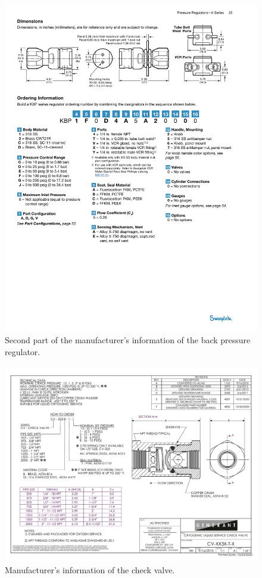 \begin{figure}[h]
    \centering
    \includegraphics[width=\textwidth]{fig/BPR-2.pdf}
    \caption{Second part of the manufacturer's information of the back pressure regulator.}
    \label{fig:swagelok_bpr_2}
\end{figure}

\begin{figure}[h]
    \centering
    \includegraphics[width=\textwidth]{fig/CV-XX3X-T-X.pdf}
    \caption{Manufacturer's information of the check valve.}
    \label{fig:generant_cv}
\end{figure}
